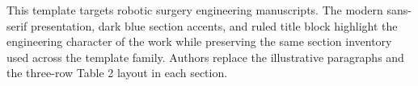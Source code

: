 
This template targets robotic surgery engineering manuscripts. The modern sans-serif presentation, dark blue section accents, and ruled title block highlight the engineering character of the work while preserving the same section inventory used across the template family. Authors replace the illustrative paragraphs and the three-row Table 2 layout in each section.
